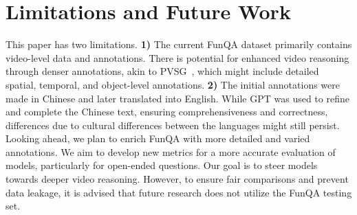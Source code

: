\section{Limitations and Future Work}
This paper has two limitations. \textbf{1)} The current FunQA dataset primarily contains video-level data and annotations. There is potential for enhanced video reasoning through denser annotations, akin to PVSG~\cite{yang2023panoptic}, which might include detailed spatial, temporal, and object-level annotations. \textbf{2)} The initial annotations were made in Chinese and later translated into English. While GPT was used to refine and complete the Chinese text, ensuring comprehensiveness and correctness, differences due to cultural differences between the languages might still persist.\\
Looking ahead, we plan to enrich FunQA with more detailed and varied annotations. We aim to develop new metrics for a more accurate evaluation of models, particularly for open-ended questions. Our goal is to steer models towards deeper video reasoning. However, to ensure fair comparisons and prevent data leakage, it is advised that future research does not utilize the FunQA testing set.
